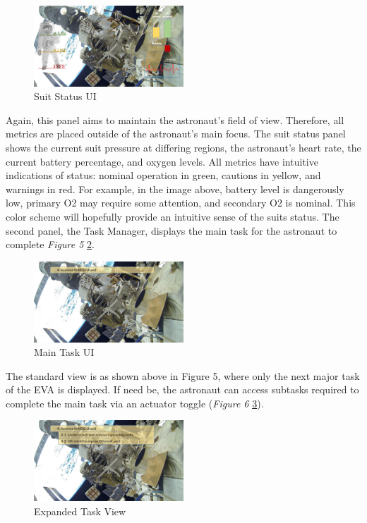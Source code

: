 \documentclass{article}
\begin{document}
\begin{figure}[!htb]
  \centering
  \includegraphics[width=0.5\textwidth]{assets/moresuitmetrics.png}
  \caption{Suit Status UI}
  \label{fig:moresuitmetrics}
\end{figure}

Again, this panel aims to maintain the astronaut’s field of view. Therefore, all metrics are placed outside of the astronaut’s main focus. The suit status panel shows the current suit pressure at differing regions, the astronaut’s heart rate, the current battery percentage, and oxygen levels. All metrics have intuitive indications of status: nominal operation in green, cautions in yellow, and warnings in red. For example, in the image above, battery level is dangerously low, primary O2 may require some attention, and secondary O2 is nominal. This color scheme will hopefully provide an intuitive sense of the suits status. The second panel, the Task Manager, displays the main task for the astronaut to complete \textit{Figure 5} \ref{fig:task4}.

\begin{figure}[!htb]
  \centering
  \includegraphics[width=0.5\textwidth]{assets/task4.png}
  \caption{Main Task UI}
  \label{fig:task4}
\end{figure}

The standard view is as shown above in Figure 5, where only the next major task of the EVA is displayed. If need be, the astronaut can access subtasks required to complete the main task via an actuator toggle (\textit{Figure 6} \ref{fig:moresubtasks}).

\begin{figure}[!htb]
  \centering
  \includegraphics[width=0.5\textwidth]{assets/moresubtasks.png}
  \caption{Expanded Task View}
  \label{fig:moresubtasks}
\end{figure}
\end{document}
